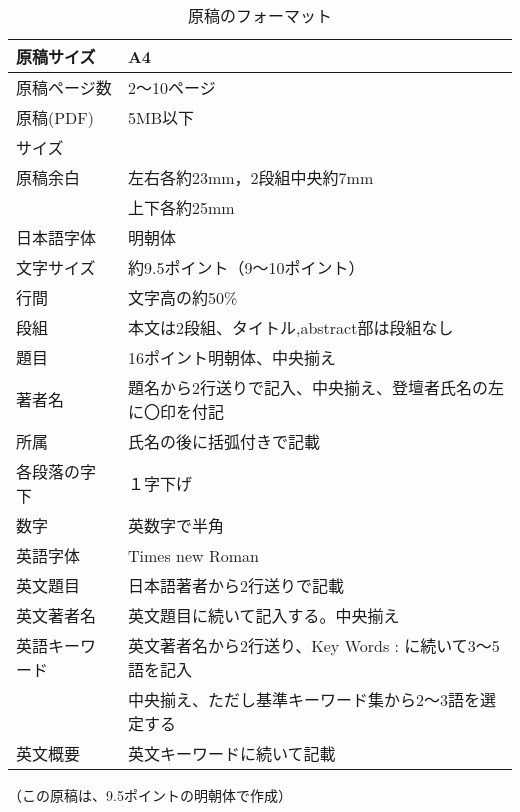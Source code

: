 \documentclass{jsass-nenkai}
\begin{document}
    \renewcommand{\arraystretch}{0.88}
    \begin{table}
      \centering
      \caption{原稿のフォーマット}
      \label{tab:fotmat_of_manuscript}
      \begin{tabular}{|p{57pt}|p{150pt}|} \hline
        原稿サイズ     & A4                                                           \\ \hline
        原稿ページ数   & 2〜10ページ                                                  \\ \hline
        原稿(PDF)      & 5MB以下                                                      \\
        サイズ         &                                                              \\ \hline
        原稿余白       & 左右各約23mm，2段組中央約7mm                                 \\
                       & 上下各約25mm                                                 \\ \hline
        日本語字体     & 明朝体                                                       \\ \hline
        文字サイズ     & 約9.5ポイント（9～10ポイント）                               \\ \hline
        行間           & 文字高の約50\%                                               \\ \hline
        段組           & 本文は2段組、タイトル,abstract部は段組なし                   \\ \hline
        題目           & 16ポイント明朝体、中央揃え                                   \\ \hline
        著者名         & 題名から2行送りで記入、中央揃え、登壇者氏名の左に〇印を付記  \\ \hline
        所属           & 氏名の後に括弧付きで記載                                     \\ \hline
        各段落の字下   & １字下げ                                                     \\ \hline
        数字           & 英数字で半角                                                 \\ \hline
        英語字体       & Times new Roman                                              \\ \hline
        英文題目       & 日本語著者から2行送りで記載                                  \\ \hline
        英文著者名     & 英文題目に続いて記入する。中央揃え                           \\ \hline
        英語キーワード & 英文著者名から2行送り、Key Words : に続いて3～5語を記入      \\
                       & 中央揃え、ただし基準キーワード集から2～3語を選定する         \\ \hline
        英文概要       & 英文キーワードに続いて記載                                   \\ \hline
      \end{tabular}
      （この原稿は、9.5ポイントの明朝体で作成）
    \end{table}
\end{document}
